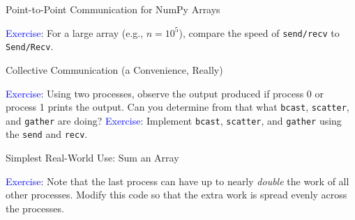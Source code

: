 \documentclass[10pt,handout]{beamer}
\begin{document}
\begin{frame}{Point-to-Point Communication for NumPy Arrays}


\vfill 
\textcolor{blue}{Exercise}: 
For a large array (e.g., $n=10^5$), compare the speed of {\tt send/recv} to 
{\tt Send/Recv}.

\end{frame}


\begin{frame}{Collective Communication (a Convenience, Really)}



\vfill 
\textcolor{blue}{Exercise}: 
Using two processes, observe the output produced if process 0 
or process 1 prints the output.  Can you determine from that 
what {\tt bcast}, {\tt scatter}, and {\tt gather} are doing? 
\vfill
\textcolor{blue}{Exercise}: 
Implement {\tt bcast}, {\tt scatter}, and {\tt gather} using 
the {\tt send} and {\tt recv}.
\end{frame}

\begin{frame}{Simplest Real-World Use: Sum an Array}




\vfill 

\textcolor{blue}{Exercise}: 
Note that the last process can have up to nearly {\it double} the 
work of all other processes.  Modify this code so that the extra
work is spread evenly across the processes.

\end{frame}
\end{document}
